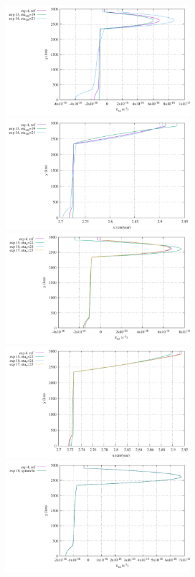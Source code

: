 \begin{center}
\includegraphics[width=8cm]{python_codes/fieldstone_148/results/fig3_exx_middle}
\includegraphics[width=8cm]{python_codes/fieldstone_148/results/fig3_u_middle}\\
\includegraphics[width=8cm]{python_codes/fieldstone_148/results/fig4_exx_middle}
\includegraphics[width=8cm]{python_codes/fieldstone_148/results/fig4_u_middle}\\
\includegraphics[width=8cm]{python_codes/fieldstone_148/results/fig5_exx_middle}

\end{center}
